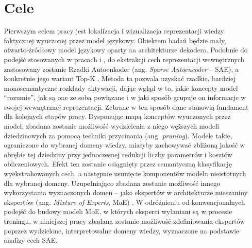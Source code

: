 \section{Cele}
\label{sec:cele}
Pierwszym celem pracy jest lokalizacja i wizualizacja reprezentacji wiedzy faktycznej wyuczonej przez model językowy. Obiektem badań będzie mały, otwarto-źródłowy model językowy oparty na architekturze dekodera. Podobnie do podejść stosowanych w pracach \cite{templeton_scaling_monosemanticity} i \cite{lanza_extraction_analysis_multimodal_concepts}, do ekstrakcji cech reprezentacji wewnętrznych zastosowany zostanie Rzadki Autoenkoder (ang. \textit{Sparse Autoencoder} -- SAE), a konkretnie jego wariant Top-K \cite{gao_2024_scaling_evaluating_sparse_autoencoders}. Metoda ta pozwala uzyskać rzadkie, bardziej monosemantyczne rozkłady aktywacji, dając wgląd w to, jakie koncepty model \enquote{rozumie}, jak są one ze sobą powiązane i w jaki sposób grupuje on informacje w swojej wewnętrznej reprezentacji. Zebrane w ten sposób dane stanowią fundament dla kolejnych etapów pracy. \newline
Dysponując mapą konceptów wyuczonych przez model, zbadana zostanie możliwość wydzielenia z niego węższych modeli dziedzinowych za pomocą techniki przycinania (ang. \textit{pruning}). Modele takie, ograniczone do wybranej domeny wiedzy, miałyby zachowywać zbliżoną jakość w obrębie tej dziedziny przy jednoczesnej redukcji liczby parametrów i kosztów obliczeniowych. Efekt ten zostanie osiągnięty przez semantyczną klasyfikację wyekstrahowanych cech, a następnie usunięcie komponentów modelu nieistotnych dla wybranej domeny. \newline
Uzupełniająco zbadana zostanie możliwość innego wykorzystania wyznaczonych domen -- jako ekspertów w architekturze mieszaniny ekspertów (ang. \textit{Mixture of Experts}, MoE) \cite{jacobs_1991_adaptive_mixtures_of_local_experts}. W odróżnieniu od konwencjonalnych podejść do budowy modeli MoE, w których eksperci wyłaniani są w procesie treningu, w niniejszej pracy zbadana zostanie możliwość zdefiniowania ekspertów poprzez wydzielone, interpretowalne domeny wiedzy, wyznaczone na podstawie analizy cech SAE.

